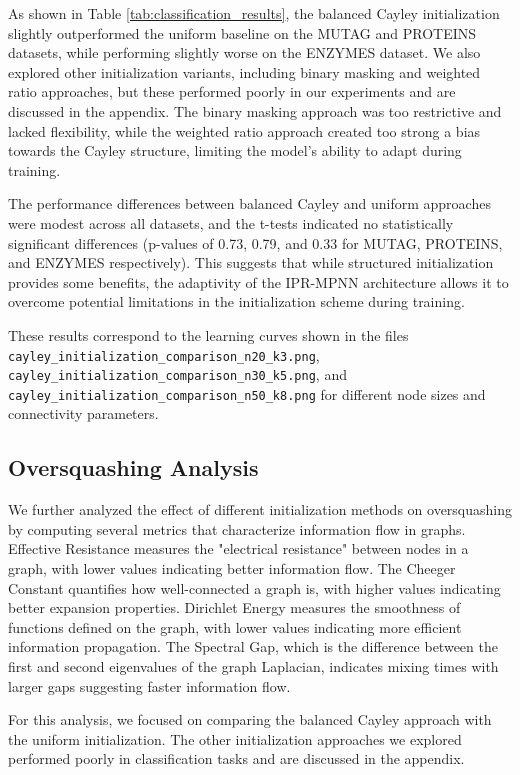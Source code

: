 \documentclass[11pt,a4paper]{article}
\begin{document}
As shown in Table \ref{tab:classification_results}, the balanced Cayley initialization slightly outperformed the uniform baseline on the MUTAG and PROTEINS datasets, while performing slightly worse on the ENZYMES dataset. We also explored other initialization variants, including binary masking and weighted ratio approaches, but these performed poorly in our experiments and are discussed in the appendix. The binary masking approach was too restrictive and lacked flexibility, while the weighted ratio approach created too strong a bias towards the Cayley structure, limiting the model's ability to adapt during training.

The performance differences between balanced Cayley and uniform approaches were modest across all datasets, and the t-tests indicated no statistically significant differences (p-values of 0.73, 0.79, and 0.33 for MUTAG, PROTEINS, and ENZYMES respectively). This suggests that while structured initialization provides some benefits, the adaptivity of the IPR-MPNN architecture allows it to overcome potential limitations in the initialization scheme during training.

These results correspond to the learning curves shown in the files \texttt{cayley\_initialization\_comparison\_n20\_k3.png}, \texttt{cayley\_initialization\_comparison\_n30\_k5.png}, and \texttt{cayley\_initialization\_comparison\_n50\_k8.png} for different node sizes and connectivity parameters.

\subsection{Oversquashing Analysis}

We further analyzed the effect of different initialization methods on oversquashing by computing several metrics that characterize information flow in graphs. Effective Resistance measures the "electrical resistance" between nodes in a graph, with lower values indicating better information flow. The Cheeger Constant quantifies how well-connected a graph is, with higher values indicating better expansion properties. Dirichlet Energy measures the smoothness of functions defined on the graph, with lower values indicating more efficient information propagation. The Spectral Gap, which is the difference between the first and second eigenvalues of the graph Laplacian, indicates mixing times with larger gaps suggesting faster information flow.

For this analysis, we focused on comparing the balanced Cayley approach with the uniform initialization. The other initialization approaches we explored performed poorly in classification tasks and are discussed in the appendix. 
\end{document}
